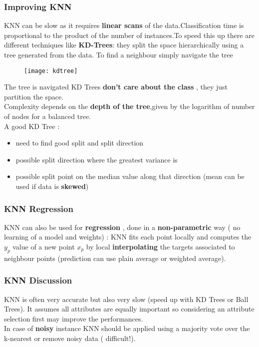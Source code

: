 \subsubsection{Improving KNN}
KNN can be slow as it requires \textbf{linear scans} of the data.Classification time is proportional to the product of the number of instances.To speed this up there are different techniques like \textbf{KD-Trees}: they split the space hierarchically  using a tree generated from the data. To find a neighbour simply navigate the tree
\begin{figure}[H]
  \centering
  \texttt{[image: kdtree]}
\end{figure}
The tree is navigated
KD Trees \textbf{don't care about the class} , they just partition the space.\\
Complexity depends on the \textbf{depth of the tree},given by the logarithm of number of nodes for a balanced tree.\\
A good KD Tree :
\begin{itemize}
\item  need to find good split and split direction
\item possible split direction where the greatest variance is
\item possible split point on the median value along that direction (mean can be used if data is \textbf{skewed})%
\end{itemize}

\subsubsection{KNN Regression}
KNN can also be used for \textbf{regression} , done in a \textbf{non-parametric} way ( no learning of a model and weights) : KNN fits each point locally and computes the $y_p$ value of a new point $x_p$ by local \textbf{interpolating} the targets associated to neighbour points (prediction can use plain average or weighted average). 

\subsubsection{KNN Discussion}
KNN is often very accurate but also very slow (speed up with KD Trees or Ball Trees). It assumes all attributes are equally important so considering an attribute selection first may improve the performances.\\
In case of \textbf{noisy} instance KNN should be applied using a majority vote over the k-nearest or remove noisy data ( difficult!).

